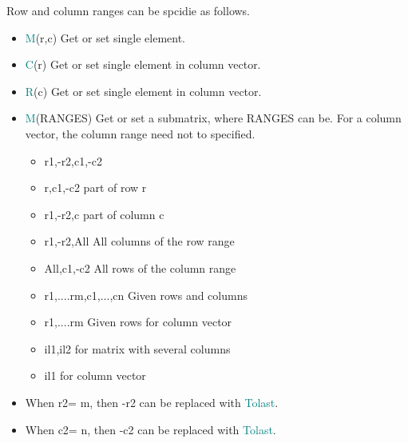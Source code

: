 Row and column ranges can be spcidie as follows.
\begin{itemize}
\item  \textcolor{teal}{M}(r,c) \tabto{5cm} Get or set single element.
\item  \textcolor{teal}{C}(r)  \tabto{5cm} Get or set single element in column vector.
\item  \textcolor{teal}{R}(c) \tabto{5cm} Get or set single element in column vector.
\item  \textcolor{teal}{M}(RANGES) \tabto{5cm} Get or set a submatrix, where RANGES
can be. For a column vector, the column range need not to specified.
\begin{itemize}
\item  r1,-r2,c1,-c2
\item  r,c1,-c2  \tabto{5cm} part of row r
\item  r1,-r2,c	\tabto{5cm} part of column c
\item  r1,-r2,All  \tabto{5cm} All columns of the row range
\item  All,c1,-c2  \tabto{5cm} All rows of the column range
\item  {r1,....rm},{c1,...,cn}  \tabto{5cm} Given rows and columns
\item  {r1,....rm}  \tabto{5cm} Given rows for column vector
\item  il1,il2   \tabto{5cm} for matrix with several columns
\item  il1   \tabto{5cm} for column vector
\end{itemize}
\item  When r2= m, then -r2 can be replaced with \textcolor{teal}{Tolast}.
\item  When c2= n, then -c2 can be replaced with \textcolor{teal}{Tolast}.
\end{itemize}

